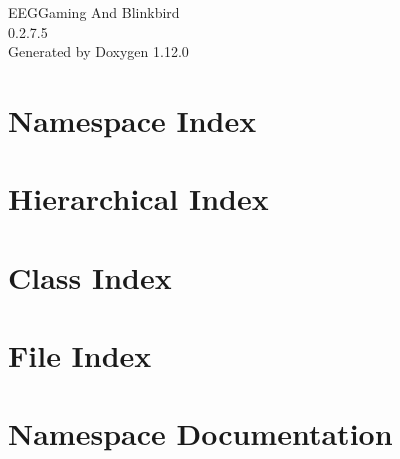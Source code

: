 \documentclass[twoside]{book}
\newcommand{\+}{\discretionary{\mbox{\scriptsize$\hookleftarrow$}}{}{}}
\newcommand{\clearemptydoublepage}{%
    \newpage{\pagestyle{empty}\cleardoublepage}%
  }
\begin{document}
  \raggedbottom
    \hypersetup{pageanchor=false,
                bookmarksnumbered=true,
                pdfencoding=unicode
               }
  \begin{titlepage}
  \vspace*{7cm}
  \begin{center}%
  {\Large EEGGaming And Blinkbird}\\
  [1ex]\large 0.\+2.\+7.\+5 \\
  \vspace*{1cm}
  {\large Generated by Doxygen 1.12.0}\\
  \end{center}
  \end{titlepage}
  \clearemptydoublepage
  \tableofcontents
  \clearemptydoublepage
  \hypersetup{pageanchor=true}

\chapter{Namespace Index}

\chapter{Hierarchical Index}

\chapter{Class Index}

\chapter{File Index}

\chapter{Namespace Documentation}









\end{document}
